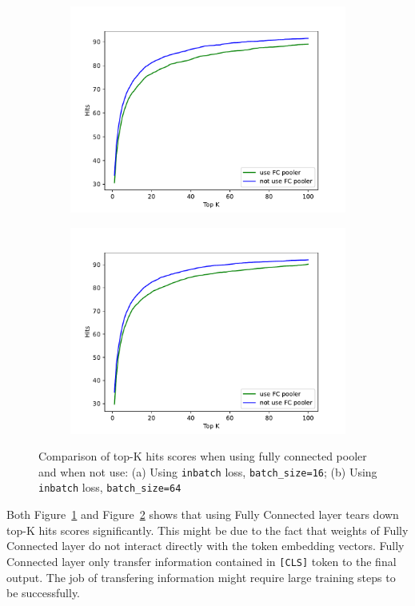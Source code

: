 \documentclass[3p, sort&compress, 12pt]{elsarticle}
\begin{document}
\begin{figure}[!htbp]
\begin{subfigure}{.5\linewidth}
	\centering
	\includegraphics[scale=.45]{images/PDF/experiments/poolerCompare_batch16.pdf}
	\caption{}
	\label{fig:20:a}
\end{subfigure}
\begin{subfigure}{.5\linewidth}
	\centering
	\includegraphics[scale=.45]{images/PDF/experiments/poolerCompare_batch64.pdf}
	\caption{}
	\label{fig:20:b}
\end{subfigure}
\caption{Comparison of top-K hits scores when using fully connected pooler and when not use: (a) Using {\tt inbatch} loss, {\tt batch\_size=16}; (b) Using {\tt inbatch} loss, {\tt batch\_size=64}}
\label{fig:20}
\end{figure} 
\par Both Figure~\ref{fig:20:a} and Figure~\ref{fig:20:b} shows that using Fully Connected layer tears down top-K hits scores significantly. This might be due to the fact that weights of Fully Connected layer do not interact directly with the token embedding vectors. Fully Connected layer only transfer information contained in {\tt [CLS]} token to the final output. The job of transfering information might require large training steps to be successfully.
\end{document}
